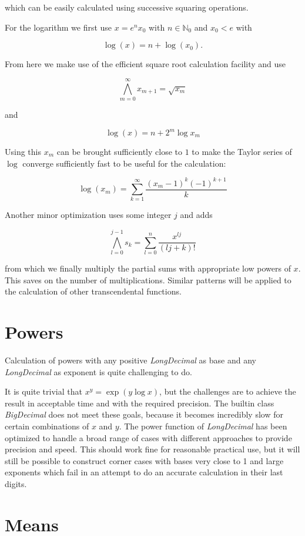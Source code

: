 \documentclass[10pt,a4paper]{article}
\begin{document}
which can be easily calculated using successive squaring operations.

For the logarithm we first use $x = e^n x_0$ with $n \in \mathbb{N}_0$ and $x_0 < e$ with

$$\log(x) = n + \log(x_0).$$

From here we make use of the efficient square root calculation facility and use

$$\bigwedge_{m=0}^\infty x_{m+1} = \sqrt{x_m}$$

and

$$\log(x) = n + 2^m \log x_m$$

Using this $x_m$ can be brought sufficiently close to $1$ to make the Taylor series of $\log$ converge sufficiently fast to be useful for the calculation:

$$\log(x_m) = \sum_{k=1}^\infty \frac{(x_m-1)^k(-1)^{k+1}}{k}$$

Another minor optimization uses some integer $j$ and adds

$$ \bigwedge_{l=0}^{j-1} s_k = \sum_{l=0}^n \frac{x^{lj}}{(lj+k)!}$$

from which we finally multiply the partial sums with appropriate low powers of $x$.  This saves on the number of multiplications.
Similar patterns will be applied to the calculation of other transcendental functions.

\pagebreak

\section{Powers}

Calculation of powers with any positive {\slshape LongDecimal\/} as base and any {\slshape LongDecimal\/} as exponent is quite challenging to do.

It is quite trivial that $x^y = \exp(y \log x)$, but the challenges
are to achieve the result in acceptable time and with the required
precision.  The builtin class {\slshape BigDecimal} does not meet
these goals, because it becomes incredibly slow for certain
combinations of $x$ and $y$.  The power function of {\slshape LongDecimal\/} has
been optimized to handle a broad range of cases with different
approaches to provide precision and speed. This should work fine for
reasonable practical use, but it will still be possible to construct
corner cases with bases very close to 1 and large exponents which fail
in an attempt to do an accurate calculation in their last digits.

\section{Means}
\end{document}
